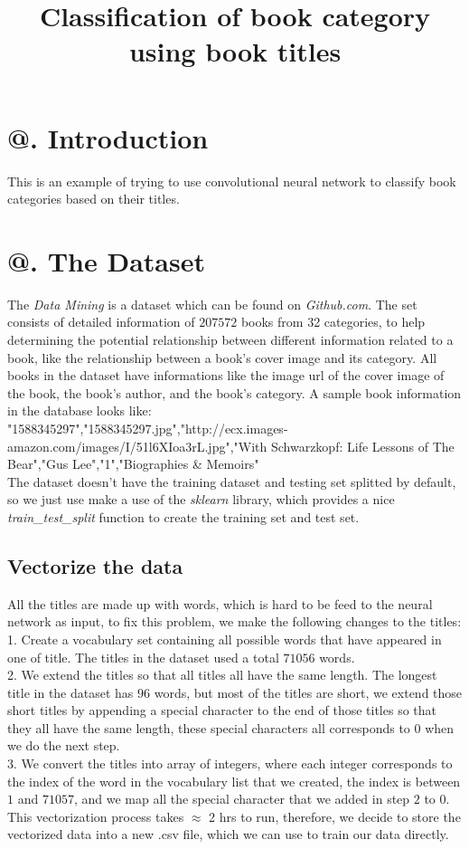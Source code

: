 \documentclass[jou,apacite]{apa6}
\title{Classification of book category using book titles}
\makeatletter
\newcommand*{\rom}[1]{\expandafter\@slowromancap\romannumeral #1@}
\makeatother
\begin{document}
\maketitle    
                        
\section{\rom{1}. Introduction}
This is an example of trying to use convolutional neural network to classify book categories based on their titles.

\section{\rom{2}. The Dataset}
The \textit{Data Mining} is a dataset which can be found on \textit{Github.com}. The set consists of detailed information of $207572$  books from 32 categories, to help determining the potential relationship between different information related to a book, like the relationship between a book's cover image and its category. All books in the dataset have informations like the image url of the cover image of the book, the book's author, and the book's category. A sample book information in the database looks like:\\
"1588345297","1588345297.jpg","http://ecx.images-amazon.com/images/I/51l6XIoa3rL.jpg","With Schwarzkopf: Life Lessons of The Bear","Gus Lee","1","Biographies \& Memoirs"\\
The dataset doesn't have the training dataset and testing set splitted by default, so we just use make a use of the \textit{sklearn} library, which provides a nice \textit{train\_test\_split} function to create the training set and test set.

\subsection{Vectorize the data}
All the titles are made up with words, which is hard to be feed to the neural network as input, to fix this problem, we make the following changes to the titles:\\
1. Create a vocabulary set containing all possible words that have appeared in one of title. The titles in the dataset used a total $71056$ words.\\
2. We extend the titles so that all titles all have the same length. The longest title in the dataset has $96$ words, but most of the titles are short, we extend those short titles by appending a special character to the end of those titles so that they all have the same length, these special characters all corresponds to $0$ when we do the next step.\\
3. We convert the titles into array of integers, where each integer corresponds to the index of the word in the vocabulary list that we created, the index is between $1$ and $71057$, and we map all the special character that we added in step $2$ to $0$.\\
This vectorization process takes $\approx$ 2 hrs to run, therefore, we decide to store the vectorized data into a new .csv file, which we can use to train our data directly.


\end{document}
